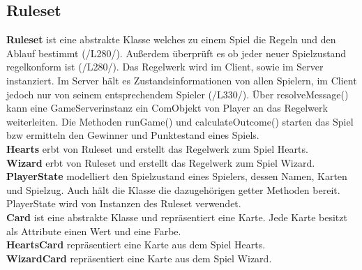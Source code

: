 \documentclass{article}
\begin{document}
	\subsection{Ruleset}
		\textbf{Ruleset} ist eine abstrakte Klasse welches zu einem Spiel die Regeln und den Ablauf bestimmt (/L280/). Außerdem überprüft es ob jeder neuer Spielzustand regelkonform ist (/L280/). Das Regelwerk wird im Client, sowie im Server instanziert. Im Server hält es Zustandsinformationen von allen Spielern, im Client jedoch nur von seinem entsprechendem Spieler (/L330/). Über resolveMessage() kann eine GameServerinstanz ein ComObjekt von Player an das Regelwerk weiterleiten. Die Methoden runGame() und calculateOutcome() starten das Spiel bzw ermitteln den Gewinner und Punktestand eines Spiels. \\
		\textbf{Hearts} erbt von Ruleset und erstellt das Regelwerk zum Spiel Hearts. \\
		\textbf{Wizard} erbt von Ruleset und erstellt das Regelwerk zum Spiel Wizard. \\
		\textbf{PlayerState} modelliert den Spielzustand eines Spielers, dessen Namen, Karten und Spielzug. Auch hält die Klasse die dazugehörigen getter Methoden bereit. PlayerState wird von Instanzen des Ruleset verwendet. \\
		\textbf{Card} ist eine abstrakte Klasse und repräsentiert eine Karte. Jede Karte besitzt als Attribute einen Wert und eine Farbe. \\
		\textbf{HeartsCard} repräsentiert eine Karte aus dem Spiel Hearts. \\
		\textbf{WizardCard} repräsentiert eine Karte aus dem Spiel Wizard.
\end{document}
